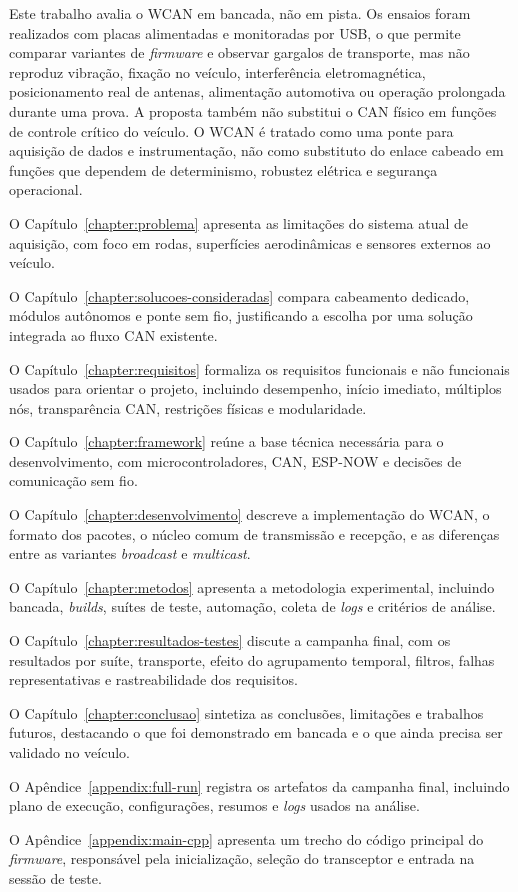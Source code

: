 Este trabalho avalia o WCAN em bancada, não em pista. Os ensaios foram realizados
com placas alimentadas e monitoradas por USB, o que permite comparar variantes de
\emph{firmware} e observar gargalos de transporte, mas não reproduz vibração, fixação no
veículo, interferência eletromagnética, posicionamento real de antenas,
alimentação automotiva ou operação prolongada durante uma prova. A proposta também
não substitui o CAN físico em funções de controle crítico do veículo. O WCAN é
tratado como uma ponte para aquisição de dados e instrumentação, não como
substituto do enlace cabeado em funções que dependem de determinismo, robustez
elétrica e segurança operacional.

O Capítulo~\ref{chapter:problema} apresenta as limitações do sistema atual de
aquisição, com foco em rodas, superfícies aerodinâmicas e sensores externos ao
veículo.

O Capítulo~\ref{chapter:solucoes-consideradas} compara cabeamento dedicado,
módulos autônomos e ponte sem fio, justificando a escolha por uma solução
integrada ao fluxo CAN existente.

O Capítulo~\ref{chapter:requisitos} formaliza os requisitos funcionais e não
funcionais usados para orientar o projeto, incluindo desempenho, início imediato,
múltiplos nós, transparência CAN, restrições físicas e modularidade.

O Capítulo~\ref{chapter:framework} reúne a base técnica necessária para o
desenvolvimento, com microcontroladores, CAN, ESP-NOW e decisões de comunicação
sem fio.

O Capítulo~\ref{chapter:desenvolvimento} descreve a implementação do WCAN, o
formato dos pacotes, o núcleo comum de transmissão e recepção, e as diferenças
entre as variantes \emph{broadcast} e \emph{multicast}.

O Capítulo~\ref{chapter:metodos} apresenta a metodologia experimental, incluindo
bancada, \emph{builds}, suítes de teste, automação, coleta de \emph{logs} e critérios de
análise.

O Capítulo~\ref{chapter:resultados-testes} discute a campanha final, com os resultados por suíte, transporte,
efeito do agrupamento temporal, filtros, falhas representativas e rastreabilidade dos
requisitos.

O Capítulo~\ref{chapter:conclusao} sintetiza as conclusões, limitações e
trabalhos futuros, destacando o que foi demonstrado em bancada e o que ainda
precisa ser validado no veículo.

O Apêndice~\ref{appendix:full-run} registra os artefatos da campanha final,
incluindo plano de execução, configurações, resumos e \emph{logs} usados na análise.

O Apêndice~\ref{appendix:main-cpp} apresenta um trecho do código principal do
\emph{firmware}, responsável pela inicialização, seleção do transceptor e entrada
na sessão de teste.
